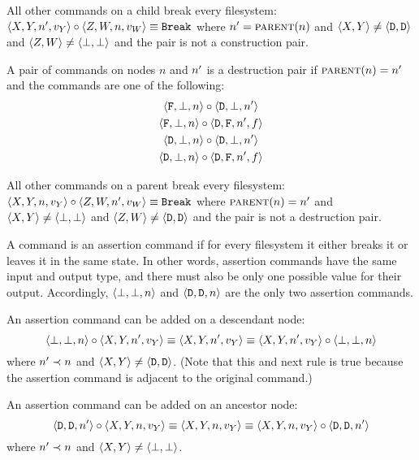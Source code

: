 \begin{myax}\label{ax_directchild_breaks}
All other commands on a child break every filesystem:
$\cxynnv\cc\czwnv \equiv \cbrk$ where $\nn=\parent(n)$ and $\cxy\neq\cdd$ and $\czw\neq\cbb$
and the pair is not a construction pair.
\end{myax}

\begin{mydef}
A pair of commands on nodes $n$ and $\nn$ is a destruction pair if $\parent(n)=\nn$ and the commands are one
of the following:
   \begin{gather*}
            \cfba{n}\cc  \cdba{\nn} \\
            \cfba{n}\cc  \cdfaa{\nn}{\valf} \\
            \cdba{n}\cc  \cdba{\nn} \\
            \cdba{n}\cc  \cdfaa{\nn}{\valf}
   \end{gather*}
\end{mydef}

\begin{myax}\label{ax_directparent_breaks}
All other commands on a parent break every filesystem:
$\cxynv\cc\czwnnv \equiv \cbrk$ where $\parent(n)=\nn$ and $\cxy\neq\cbb$ and $\czw\neq\cdd$
and the pair is not a destruction pair.
\end{myax}

\begin{mydef}
A command is an assertion command if
for every filesystem it either breaks it or leaves it in the same state.
In other words, assertion commands have the same input and output type,
and there must also be only one possible value for their output.
Accordingly, $\cbba{n}$ and $\cdda{n}$ are the only two assertion commands.
\end{mydef}

\begin{myax}\label{ax_child_assert}
An assertion command can be added on a descendant node:
\[ \cbba{n}\cc\cxynnv \equiv \cxynnv \equiv \cxynnv\cc\cbba{n} \] 
where $\nn\descendant n$ and $\cxy\neq\cdd$.
(Note that this and next rule is true because the assertion command is
adjacent to the original command.)
\end{myax}

\begin{myax}\label{ax_parent_assert}
An assertion command can be added on an ancestor node:
\[ \cdda{\nn}\cc\cxynv \equiv \cxynv \equiv \cxynv\cc\cdda{\nn} \]
where $\nn\descendant n$ and $\cxy\neq\cbb$.
\end{myax}

